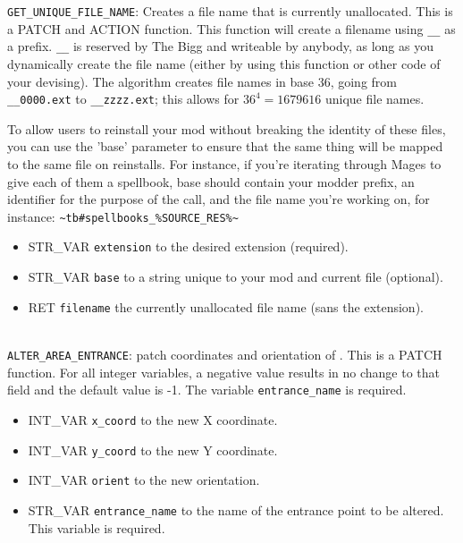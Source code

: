 \documentclass{article}
\begin{document}
\verb+GET_UNIQUE_FILE_NAME+: Creates a file name that is currently unallocated.
This is a PATCH and ACTION function.
This function will create a filename using \verb+__+ as a
prefix. \verb+__+ is reserved by The Bigg and writeable by anybody, as
long as you dynamically create the file name (either by using this
function or other code of your devising). The algorithm creates file
names in base 36, going from \verb+__0000.ext+ to \verb+__zzzz.ext+;
this allows for $36^4 = 1679616$ unique file names.



To allow users to reinstall your mod without breaking the identity of these files, you
can use the 'base' parameter to ensure that the same thing will be mapped to the same
file on reinstalls. For instance, if you're iterating through Mages to give each of
them a spellbook, base should contain your modder prefix, an identifier for the purpose
of the call, and the file name you're working on, for instance:
\verb+~tb#spellbooks_%SOURCE_RES%~+
\begin{itemize}
\item STR_VAR \verb+extension+ to the desired extension (required).
\item STR_VAR \verb+base+ to a string unique to your mod and current file (optional).
\item RET \verb+filename+ the currently unallocated file name (sans the extension).
\end{itemize}
\\

\verb+ALTER_AREA_ENTRANCE+: patch coordinates and orientation of .
This is a PATCH function. For all integer variables, a negative value results in no change to that field and the default value is -1. The variable \verb+entrance_name+ is required.
\begin{itemize}
\item INT_VAR \verb+x_coord+ to the new X coordinate.
\item INT_VAR \verb+y_coord+ to the new Y coordinate.
\item INT_VAR \verb+orient+ to the new orientation.
\item STR_VAR \verb+entrance_name+ to the name of the entrance point to be altered. This variable is required.
\end{itemize}
\\
\end{document}
